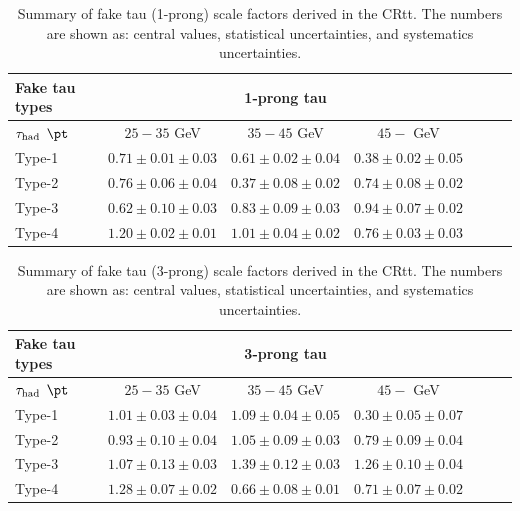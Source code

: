 \begin{table}
\caption{ Summary of fake tau (1-prong) scale factors derived in the CRtt. The numbers are shown as: central values, statistical uncertainties, and systematics uncertainties. }
\begin{center}
\begin{tabular}{lcccccc}
\toprule\toprule

Fake tau types & \multicolumn{3}{c}{1-prong tau}  \\ \midrule
$\tau_\text{had}$ $\pt$                                   &  $25-35$ GeV  & $35-45$ GeV  &  $45-$ GeV            \\
\midrule
Type-1                          &$0.71 \pm 0.01 \pm 0.03 $ &$0.61 \pm 0.02 \pm 0.04 $ &$0.38 \pm 0.02 \pm 0.05 $  \\
Type-2                          &$0.76 \pm 0.06 \pm 0.04 $ & $0.37 \pm 0.08 \pm 0.02$ & $0.74 \pm 0.08 \pm 0.02 $ \\
Type-3                          &$0.62 \pm 0.10 \pm 0.03 $ &$0.83 \pm 0.09 \pm 0.03 $ &$0.94 \pm 0.07 \pm 0.02 $  \\
Type-4                          &$1.20 \pm 0.02 \pm 0.01 $ & $1.01 \pm 0.04 \pm 0.02 $ &$0.76 \pm 0.03 \pm 0.03 $  \\
\bottomrule\bottomrule
\end{tabular}
\label{tab:ff1_summary}
\end{center}
\end{table}


\begin{table}
\caption{ Summary of fake tau (3-prong) scale factors derived in the CRtt. The numbers are shown as: central values, statistical uncertainties, and systematics uncertainties. }
\begin{center}
\begin{tabular}{lcccccc}
\toprule\toprule

Fake tau types        & \multicolumn{3}{c}{3-prong tau}  \\ \midrule
$\tau_\text{had}$ $\pt$                             &  $25-35$ GeV  & $35-45$ GeV       &  $45-$ GeV  \\
\midrule
Type-1                                    & $1.01 \pm 0.03 \pm 0.04 $ & $1.09 \pm 0.04 \pm 0.05 $ & $0.30 \pm 0.05 \pm 0.07 $ \\
Type-2                                    & $0.93 \pm 0.10 \pm 0.04 $ & $1.05 \pm 0.09 \pm 0.03 $ & $0.79 \pm 0.09 \pm 0.04 $ \\
Type-3                                    & $1.07 \pm 0.13 \pm 0.03 $ &$1.39 \pm 0.12 \pm 0.03 $ &$1.26 \pm 0.10 \pm 0.04 $  \\
Type-4                                    &$1.28 \pm 0.07 \pm 0.02 $ &$0.66 \pm 0.08 \pm 0.01 $ & $0.71 \pm 0.07 \pm 0.02 $ \\
\bottomrule\bottomrule
\end{tabular}
\label{tab:ff2_summary}
\end{center}
\end{table}


